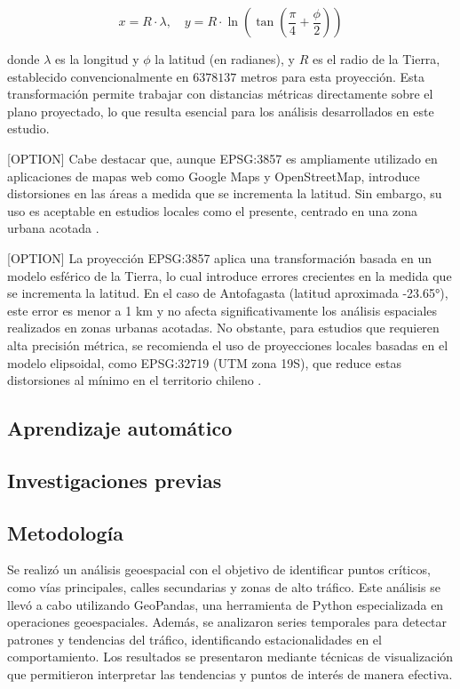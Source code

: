 \documentclass[12pt]{article}
\begin{document}
\[
x = R \cdot \lambda,\quad
y = R \cdot \ln\left(\tan\left(\frac{\pi}{4} + \frac{\phi}{2}\right)\right)
\]

donde $\lambda$ es la longitud y $\phi$ la latitud (en radianes), y $R$ es el radio de la Tierra, establecido convencionalmente en $6378137$ metros para esta proyección. Esta transformación permite trabajar con distancias métricas directamente sobre el plano proyectado, lo que resulta esencial para los análisis desarrollados en este estudio.

[OPTION]
Cabe destacar que, aunque EPSG:3857 es ampliamente utilizado en aplicaciones de mapas web como Google Maps y OpenStreetMap, introduce distorsiones en las áreas a medida que se incrementa la latitud. Sin embargo, su uso es aceptable en estudios locales como el presente, centrado en una zona urbana acotada \citep{epsg3857}.

[OPTION]
La proyección EPSG:3857 aplica una transformación basada en un modelo esférico de la Tierra, lo cual introduce errores crecientes en la medida que se incrementa la latitud. En el caso de Antofagasta (latitud aproximada -23.65°), este error es menor a 1 km y no afecta significativamente los análisis espaciales realizados en zonas urbanas acotadas. No obstante, para estudios que requieren alta precisión métrica, se recomienda el uso de proyecciones locales basadas en el modelo elipsoidal, como EPSG:32719 (UTM zona 19S), que reduce estas distorsiones al mínimo en el territorio chileno \cite{epsg3857}.


\subsection{Aprendizaje automático}
\subsection{Investigaciones previas}

\subsection{Metodología}


Se realizó un análisis geoespacial con el objetivo de identificar puntos críticos, como vías principales, calles secundarias y zonas de alto tráfico. Este análisis se llevó a cabo utilizando GeoPandas, una herramienta de Python especializada en operaciones geoespaciales. Además, se analizaron series temporales para detectar patrones y tendencias del tráfico, identificando estacionalidades en el comportamiento. Los resultados se presentaron mediante técnicas de visualización que permitieron interpretar las tendencias y puntos de interés de manera efectiva.
\end{document}
